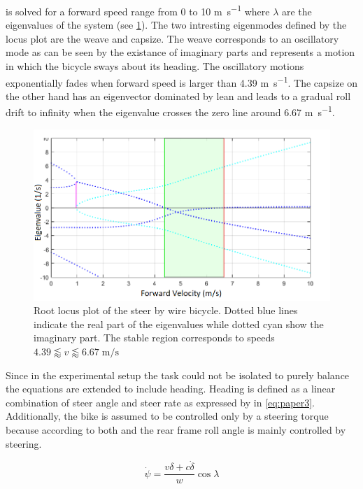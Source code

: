 is solved for a forward speed range from 0 to 10 \si{\meter\per\second} where \ensuremath{\lambda} are the eigenvalues of the system (see \cref{fig:paper2}). The two intresting eigenmodes defined by the locus plot are the weave and capsize. The weave corresponds to an oscillatory mode as can be seen by the existance of imaginary parts and represents a motion in which the bicycle sways about its heading. The oscillatory motions exponentially fades when forward speed is larger than 4.39 \si{\meter\per\second}. The capsize on the other hand has an eigenvector dominated by lean and leads to a gradual roll drift to infinity when the eigenvalue crosses the zero line around 6.67 \si{\meter\per\second}.
\begin{figure}[ht]
    \centering
    \captionsetup{justification=centering,margin=2cm}

    \includegraphics[scale=0.6]{images/root_locus_steerbywire.png}
    \caption{Root locus plot of the steer by wire bicycle. Dotted blue lines indicate the real part of the eigenvalues while dotted cyan show the imaginary part. The stable region corresponds to speeds  \ensuremath{4.39\lessapprox v \lessapprox 6.67\; \si{\meter\per\second}}}
    \label{fig:paper2}
\end{figure}
Since in the experimental setup the task could not be isolated to purely balance the equations are extended to include heading. Heading is defined as a linear combination of steer angle and steer rate as expressed by \citet{meijaard2007linearized} in \cref{eq:paper3}. Additionally, the bike is assumed to be controlled only by a steering torque because according to both \citet{moore2012human} and \citet{weir1973manual}  the rear frame roll angle is mainly
controlled by steering. 

\begin{equation}
    \dot{\psi}=\frac{v \delta+c \dot{\delta}}{w} \cos \lambda
    \label{eq:paper3}
    \end{equation}


